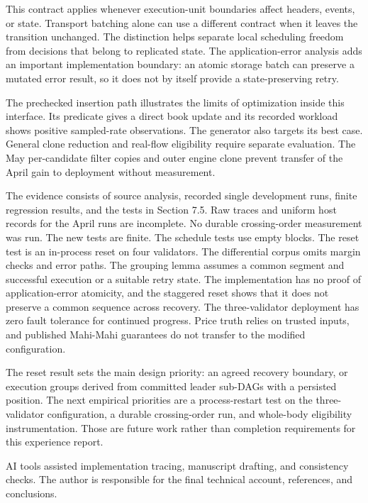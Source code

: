 \documentclass[11pt]{article}
\begin{document}
This contract applies whenever execution-unit boundaries affect headers, events, or state. Transport batching alone can use a different contract when it leaves the transition unchanged. The distinction helps separate local scheduling freedom from decisions that belong to replicated state. The application-error analysis adds an important implementation boundary: an atomic storage batch can preserve a mutated error result, so it does not by itself provide a state-preserving retry.

The prechecked insertion path illustrates the limits of optimization inside this interface. Its predicate gives a direct book update and its recorded workload shows positive sampled-rate observations. The generator also targets its best case. General clone reduction and real-flow eligibility require separate evaluation. The May per-candidate filter copies and outer engine clone prevent transfer of the April gain to deployment without measurement.

The evidence consists of source analysis, recorded single development runs, finite regression results, and the tests in Section 7.5. Raw traces and uniform host records for the April runs are incomplete. No durable crossing-order measurement was run. The new tests are finite. The schedule tests use empty blocks. The reset test is an in-process reset on four validators. The differential corpus omits margin checks and error paths. The grouping lemma assumes a common segment and successful execution or a suitable retry state. The implementation has no proof of application-error atomicity, and the staggered reset shows that it does not preserve a common sequence across recovery. The three-validator deployment has zero fault tolerance for continued progress. Price truth relies on trusted inputs, and published Mahi-Mahi guarantees do not transfer to the modified configuration.

The reset result sets the main design priority: an agreed recovery boundary, or execution groups derived from committed leader sub-DAGs with a persisted position. The next empirical priorities are a process-restart test on the three-validator configuration, a durable crossing-order run, and whole-body eligibility instrumentation. Those are future work rather than completion requirements for this experience report.

AI tools assisted implementation tracing, manuscript drafting, and consistency checks. The author is responsible for the final technical account, references, and conclusions.
\end{document}
